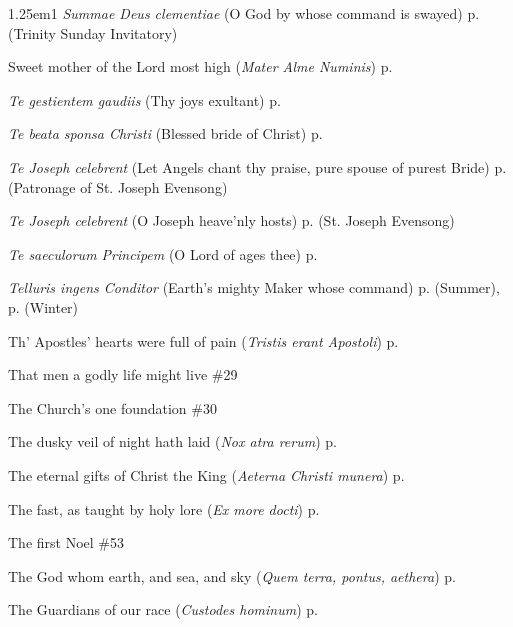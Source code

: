\begin{hangparas}{1.25em}{1}
\textit{Summae Deus clementiae} (O God by whose command is swayed) \dotfill p. \pageref{TrinityInvitatory} (Trinity Sunday Invitatory)
\par\noindent
Sweet mother of the Lord most high (\textit{Mater Alme Numinis}) \dotfill p. \pageref{MotherhoodMattins}
\par\noindent
\textit{Te gestientem gaudiis} (Thy joys exultant) \dotfill p. \pageref{HolyRosaryIIEvensong}
\par\noindent
\textit{Te beata sponsa Christi} (Blessed bride of Christ) \dotfill p. \pageref{ScholasticaEvensong}
\par\noindent
\textit{Te Joseph celebrent} (Let Angels chant thy praise, pure spouse of purest Bride) \dotfill p. \pageref{PatronageEvensong} (Patronage of St. Joseph Evensong)
\par\noindent
\textit{Te Joseph celebrent} (O Joseph heave'nly hosts) \dotfill p. \pageref{JosephEvensong} (St. Joseph Evensong)
\par\noindent
\textit{Te saeculorum Principem} (O Lord of ages thee) \dotfill p. \pageref{ChristTheKingEvensong}
\par\noindent
\textit{Telluris ingens Conditor} (Earth's mighty Maker whose command) \dotfill p. \pageref{TuesdayEvensongSummer} (Summer), p. \pageref{TuesdayEvensongWinter} (Winter)
\par\noindent
Th' Apostles' hearts were full of pain (\textit{Tristis erant Apostoli}) \dotfill p. \pageref{ApostlesEvensongEaster}
\par\noindent
That men a godly life might live \dotfill \#29
\par\noindent
The Church's one foundation \dotfill \#30
\par\noindent
The dusky veil of night hath laid (\textit{Nox atra rerum}) \dotfill p. \pageref{ThursdayInvitatory}
\par\noindent
The eternal gifts of Christ the King (\textit{Aeterna Christi munera}) \dotfill p. \pageref{ApostlesInvitatory}
\par\noindent
The fast, as taught by holy lore (\textit{Ex more docti}) \dotfill p. \pageref{FirstLentInvitatoryHymn}
\par\noindent
The first Noel \dotfill \#53
\par\noindent
The God whom earth, and sea, and sky (\textit{Quem terra, pontus, aethera}) \dotfill p. \pageref{BVMInvitatory}
\par\noindent
The Guardians of our race (\textit{Custodes hominum}) \dotfill p. \pageref{GuardianAngelsEvensong}

\end{hangparas}
